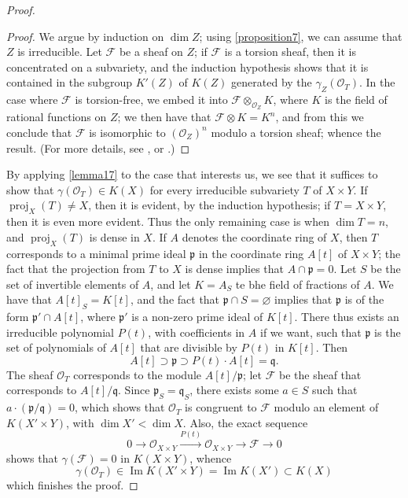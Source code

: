 \documentclass{article}
\theoremstyle{plain}
\theoremstyle{definition}
\newcommand{\sh}[1]{{\mathscr{#1}}}
\DeclareMathOperator{\proj}{proj}
\begin{document}
\begin{proof}
  \begin{proof}
    We argue by induction on $\dim Z$;
    using \cref{proposition7}, we can assume that $Z$ is irreducible.
    Let $\sh{F}$ be a sheaf on $Z$;
    if $\sh{F}$ is a torsion sheaf, then it is concentrated on a subvariety, and the induction hypothesis shows that it is contained in the subgroup $K'(Z)$ of $K(Z)$ generated by the $\gamma_Z(\sh{O}_T)$.
    In the case where $\sh{F}$ is torsion-free, we embed it into $\sh{F}\otimes_{\sh{O}_Z}K$, where $K$ is the field of rational functions on $Z$;
    we then have that $\sh{F}\otimes K=K^n$, and from this we conclude that $\sh{F}$ is isomorphic to $(\sh{O}_Z)^n$ modulo a torsion sheaf;
    whence the result.
    (For more details, see \cite{14}, or \cite{6}.)
  \end{proof}

  By applying \cref{lemma17} to the case that interests us, we see that it suffices to show that $\gamma(\sh{O}_T)\in K(X)$ for every irreducible subvariety $T$ of $X\times Y$.
  If $\proj_X(T)\neq X$, then it is evident, by the induction hypothesis;
  if $T=X\times Y$, then it is even more evident.
  Thus the only remaining case is when $\dim T=n$, and $\proj_X(T)$ is dense in $X$.
  If $A$ denotes the coordinate ring of $X$, then $T$ corresponds to a minimal prime ideal $\mathfrak{p}$ in the coordinate ring $A[t]$ of $X\times Y$;
  the fact that the projection from $T$ to $X$ is dense implies that $A\cap\mathfrak{p}=0$.
  Let $S$ be the set of invertible elements of $A$, and let $K=A_S$ te bhe field of fractions of $A$.
  We have that $A[t]_S=K[t]$, and the fact that $\mathfrak{p}\cap S=\varnothing$ implies that $\mathfrak{p}$ is of the form $\mathfrak{p}'\cap A[t]$, where $\mathfrak{p}'$ is a non-zero prime ideal of $K[t]$.
  There thus exists an irreducible polynomial $P(t)$, with coefficients in $A$ if we want, such that $\mathfrak{p}$ is the set of polynomials of $A[t]$ that are divisible by $P(t)$ in $K[t]$.
  Then
  \[
    A[t] \supset \mathfrak{p} \supset P(t)\cdot A[t] = \mathfrak{q}.
  \]
  The sheaf $\sh{O}_T$ corresponds to the module $A[t]/\mathfrak{p}$;
  let $\sh{F}$ be the sheaf that corresponds to $A[t]/\mathfrak{q}$.
  Since $\mathfrak{p}_S=\mathfrak{q}_S$, there exists some $a\in S$ such that $a\cdot(\mathfrak{p}/\mathfrak{q})=0$, which shows that $\sh{O}_T$ is congruent to $\sh{F}$ modulo an element of $K(X'\times Y)$, with $\dim X'<\dim X$.
  Also, the exact sequence
  \[
    0 \to \sh{O}_{X\times Y} \xrightarrow{P(t)} \sh{O}_{X\times Y} \to \sh{F} \to 0
  \]
  shows that $\gamma(\sh{F})=0$ in $K(X\times Y)$, whence
  \[
    \gamma(\sh{O}_T) \in \operatorname{Im} K(X'\times Y) = \operatorname{Im} K(X') \subset K(X)
  \]
  which finishes the proof.
\end{proof}
\end{document}
